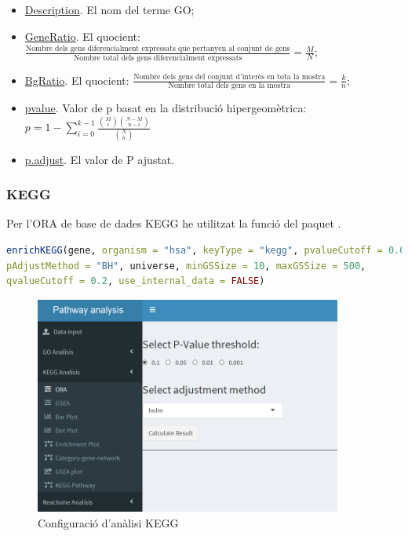 \documentclass[]{article}
\begin{document}
\begin{itemize}
\item \underline{Description}. El nom del terme GO;
\item \underline{GeneRatio}. El quocient: $\displaystyle\frac{\mbox{Nombre dels gens diferencialment expressats que pertanyen al conjunt de gens}}{\mbox{Nombre total dels gens diferencialment expressats}}=\frac{M}{N}$; 
\item \underline{BgRatio}. El quocient: $\displaystyle\frac{\mbox{Nombre dels gens del conjunt d'interès en tota la mostra}}{\mbox{Nombre total dels gens  en la mostra}}=\frac{k}{n}$;
\item \underline{pvalue}. Valor de p basat en la distribució hipergeomètrica: $p = 1 - \displaystyle\sum_{i = 0}^{k-1}\frac{{M \choose i}{{N-M} \choose {n-i}}} {{N \choose n}}$
\item \underline{p.adjust}. El valor de P ajustat.
\end{itemize}

\subsubsection{KEGG}

Per l'ORA de base de dades KEGG he utilitzat la funció  del paquet . 

\begin{lstlisting}[language=R]
enrichKEGG(gene, organism = "hsa", keyType = "kegg", pvalueCutoff = 0.05, 
pAdjustMethod = "BH", universe, minGSSize = 10, maxGSSize = 500, 
qvalueCutoff = 0.2, use_internal_data = FALSE)
\end{lstlisting}



\begin{figure}[H]
\centering
\includegraphics[width=0.9\textwidth]{App_F7_Items_KEGG_ORA.png} 
\caption{Configuració d'anàlisi KEGG}
\end{figure}
\end{document}
